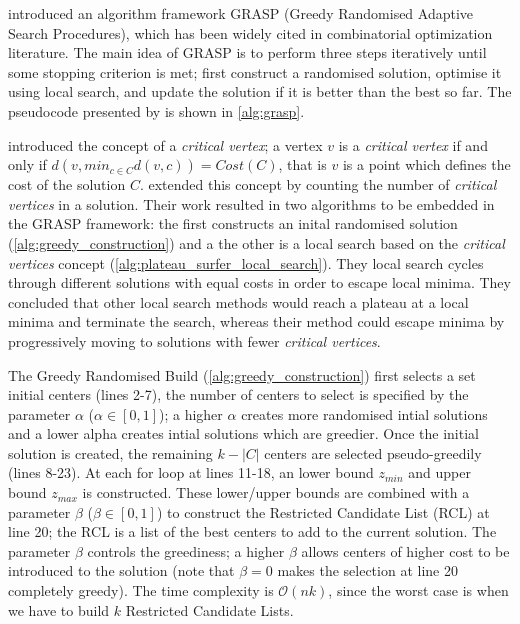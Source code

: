\textcite{feo_greedy_1995} introduced an algorithm framework GRASP (Greedy Randomised Adaptive Search Procedures), which has been widely cited in combinatorial optimization literature. The main idea of GRASP is to perform three steps iteratively until some stopping criterion is met; first construct a randomised solution, optimise it using local search, and update the solution if it is better than the best so far. The pseudocode presented by \textcite{feo_greedy_1995} is shown in \cref{alg:grasp}.



\textcite{mladenovic_solving_2003} introduced the concept of a \emph{critical vertex}; a vertex $v$ is a \emph{critical vertex} if and only if $d(v, min_{c\in C}d(v, c))=Cost(C)$, that is $v$ is a point which defines the cost of the solution $C$. \textcite{battiti_new_2017} extended this concept by counting the number of \emph{critical vertices} in a solution. Their work resulted in two algorithms to be embedded in the GRASP framework: the first constructs an inital randomised solution (\cref{alg:greedy_construction}) and a the other is a local search based on the \emph{critical vertices} concept (\cref{alg:plateau_surfer_local_search}). They local search cycles through different solutions with equal costs in order to escape local minima. They concluded that other local search methods would reach a plateau at a local minima and terminate the search, whereas their method could escape minima by progressively moving to solutions with fewer \emph{critical vertices}.

The Greedy Randomised Build (\cref{alg:greedy_construction}) first selects a set initial centers (lines 2-7), the number of centers to select is specified by the parameter $\alpha$ ($\alpha\in [0, 1]$); a higher $\alpha$ creates more randomised intial solutions and a lower alpha creates intial solutions which are greedier. Once the initial solution is created, the remaining $k-|C|$ centers are selected pseudo-greedily (lines 8-23). At each for loop at lines 11-18, an lower bound $z_{min}$ and upper bound $z_{max}$ is constructed. These lower/upper bounds are combined with a parameter $\beta$ ($\beta\in [0, 1]$) to construct the Restricted Candidate List (RCL) at line 20; the RCL is a list of the best centers to add to the current solution. The parameter $\beta$ controls the greediness; a higher $\beta$ allows centers of higher cost to be introduced to the solution (note that $\beta=0$ makes the selection at line 20 completely greedy). The time complexity is $\mathcal{O}(nk)$, since the worst case is when we have to build $k$ Restricted Candidate Lists.  

